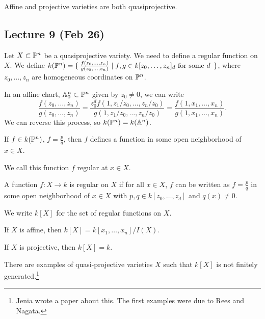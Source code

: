\documentclass[twoside, 10pt]{article}
\begin{document}
    \begin{exm} Affine and projective varieties are both quasiprojective.
    \end{exm}

    \subsection{Lecture 9 (Feb 26)} Let $X \subset \P^n$ be a quasiprojective
    variety. We need to define a regular function on $X$. We define $k(\P^n) =
    \set{\frac{f(z_0, \ldots, z_n)}{g(z_0, \ldots, z_n)} | f,g \in k[z_0,
        \ldots, z_n]_d \text{ for some $d$ }}$, where $z_0, \ldots, z_n$ are
        homogeneous coordinates on $\P^n$.

    \begin{rmk} In an affine chart, $\A_0^n \subset \P^n$ given by $z_0 \neq
        0$, we can write \[ \frac{f(z_0, \ldots, z_n)}{g(z_0, \ldots, z_n)} =
        \frac{z_0^df(1,z_1/z_0, \ldots, z_n/z_0)}{g(1, z_1/z_0, \ldots,
    z_n/z_0)} = \frac{f(1, x_1, \ldots, x_n)}{g(1, x_1, \ldots, x_n)}. \] We
can reverse this process, so $k(\P^n) = k(\A^n)$.  \end{rmk}

    If $f \in k(\P^n)$, $f = \frac{p}{q}$, then $f$ defines a function in some
    open neighborhood of $x \in X$.  \begin{defn} We call
    this function $f$ regular at $x \in X$.  \end{defn}

    \begin{defn} A function $f:X \to k$ is regular on $X$ if
    for all $x \in X$, $f$ can be written as $f = \frac{p}{q}$ in some open
neighborhood of $x \in X$ with $p,q \in k[z_0, \ldots, z_d]$ and $q(x) \neq 0$.
\end{defn}

    \begin{rmk} We write $k[X]$ for the set of regular functions on $X$.
    \end{rmk}

    \begin{rmk} If $X$ is affine, then $k[X] = k[x_1, \ldots, x_n]/I(X)$.
    \end{rmk}

    \begin{rmk} If $X$ is projective, then $k[X] = k$.  \end{rmk}

    \begin{rmk} There are examples of quasi-projective varieties $X$ such that
    $k[X]$ is not finitely generated.\footnote{Jenia wrote a paper about this.
The first examples were due to Rees and Nagata.} \end{rmk}
\end{document}
